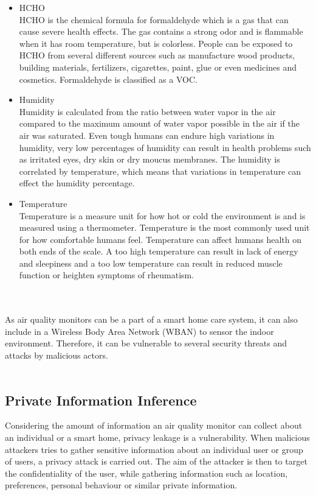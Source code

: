\begin{itemize}
     \item HCHO\\
        HCHO is the chemical formula for formaldehyde which is a gas that can cause severe health effects. \cite{HCHO} The gas contains a strong odor and is flammable when it has room temperature, but is colorless. People can be exposed to HCHO from several different sources such as manufacture wood products, building materials, fertilizers, cigarettes, paint, glue or even medicines and cosmetics. Formaldehyde is classified as a VOC.
    \item Humidity\\
        Humidity is calculated from the ratio between water vapor in the air compared to the maximum amount of water vapor possible in the air if the air was saturated. \cite{RecommendedIAQ} Even tough humans can endure high variations in humidity, very low percentages of humidity can result in health problems such as irritated eyes, dry skin or dry moucus membranes. The humidity is correlated by temperature, which means that variations in temperature can effect the humidity percentage.
    \item Temperature\\
        Temperature is a measure unit for how hot or cold the environment is and is measured using a thermometer. Temperature is the most commonly used unit for how comfortable humans feel. Temperature can affect humans health on both ends of the scale. A too high temperature can result in lack of energy and sleepiness and a too low temperature can result in reduced muscle function or heighten symptoms of rheumatism. \cite{Temp}
\end{itemize}


\\\\
As air quality monitors can be a part of a smart home care system, it can also include in a Wireless Body Area Network (WBAN) to sensor the indoor environment. Therefore, it can be vulnerable to several security threats and attacks by malicious actors. \cite{AttackstoAQMs} 
\\\\

\subsection*{Private Information Inference}
Considering the amount of information an air quality monitor can collect about an individual or a smart home, privacy leakage is a vulnerability. \cite{SecPrivSmartCity} When malicious attackers tries to gather sensitive information about an individual user or group of users, a privacy attack is carried out. \cite{CyberEntitySecInIoT} The aim of the attacker is then to target the confidentiality of the user, while gathering information such as location, preferences, personal behaviour or similar private information.

